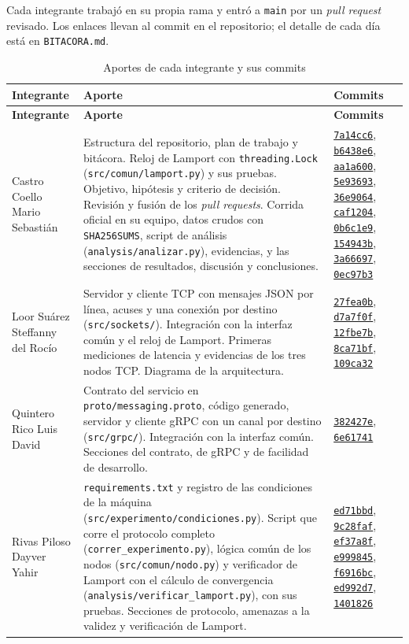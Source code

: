 Cada integrante trabajó en su propia rama y entró a \texttt{main} por un \emph{pull request} revisado. Los enlaces llevan al commit en el repositorio; el detalle de cada día está en \texttt{BITACORA.md}.

\newcommand{\commit}[1]{\href{https://github.com/reyshadow0/isr701-pe-u1/commit/#1}{\texttt{#1}}}

{\footnotesize
\begin{longtable}{@{}>{\raggedright\arraybackslash}p{2.8cm}>{\raggedright\arraybackslash}p{7.3cm}>{\raggedright\arraybackslash}p{4.9cm}@{}}
  \caption{Aportes de cada integrante y sus commits}
  \label{tab:aportes} \\
  \toprule
  \textbf{Integrante} & \textbf{Aporte} & \textbf{Commits} \\
  \midrule
  \endfirsthead
  \toprule
  \textbf{Integrante} & \textbf{Aporte} & \textbf{Commits} \\
  \midrule
  \endhead
  Castro Coello Mario Sebastián &
  Estructura del repositorio, plan de trabajo y bitácora. Reloj de Lamport con \texttt{threading.Lock} (\texttt{src/comun/lamport.py}) y sus pruebas. Objetivo, hipótesis y criterio de decisión. Revisión y fusión de los \emph{pull requests}. Corrida oficial en su equipo, datos crudos con \texttt{SHA256SUMS}, script de análisis (\texttt{analysis/analizar.py}), evidencias, y las secciones de resultados, discusión y conclusiones. &
  \commit{7a14cc6}, \commit{b6438e6}, \commit{aa1a600}, \commit{5e93693}, \commit{36e9064}, \commit{caf1204}, \commit{0b6c1e9}, \commit{154943b}, \commit{3a66697}, \commit{0ec97b3} \\
  \midrule
  Loor Suárez Steffanny del Rocío &
  Servidor y cliente TCP con mensajes JSON por línea, acuses y una conexión por destino (\texttt{src/sockets/}). Integración con la interfaz común y el reloj de Lamport. Primeras mediciones de latencia y evidencias de los tres nodos TCP. Diagrama de la arquitectura. &
  \commit{27fea0b}, \commit{d7a7f0f}, \commit{12fbe7b}, \commit{8ca71bf}, \commit{109ca32} \\
  \midrule
  Quintero Rico Luis David &
  Contrato del servicio en \texttt{proto/messaging.proto}, código generado, servidor y cliente gRPC con un canal por destino (\texttt{src/grpc/}). Integración con la interfaz común. Secciones del contrato, de gRPC y de facilidad de desarrollo. &
  \commit{382427e}, \commit{6e61741} \\
  \midrule
  Rivas Piloso Dayver Yahir &
  \texttt{requirements.txt} y registro de las condiciones de la máquina (\texttt{src/experimento/condiciones.py}). Script que corre el protocolo completo (\texttt{correr\_experimento.py}), lógica común de los nodos (\texttt{src/comun/nodo.py}) y verificador de Lamport con el cálculo de convergencia (\texttt{analysis/verificar\_lamport.py}), con sus pruebas. Secciones de protocolo, amenazas a la validez y verificación de Lamport. &
  \commit{ed71bbd}, \commit{9c28faf}, \commit{ef37a8f}, \commit{e999845}, \commit{f6916bc}, \commit{ed992d7}, \commit{1401826} \\
  \bottomrule
\end{longtable}
}
